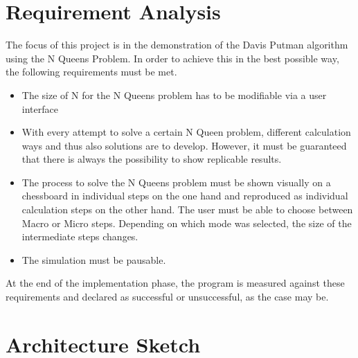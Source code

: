 \section{Requirement Analysis}
The focus of this project is in the demonstration of the Davis Putman algorithm using the N Queens Problem. In order to achieve this in the best possible way, the following requirements must be met. 
\begin{itemize}
\item The size of N for the N Queens problem has to be modifiable via a user interface
\item With every attempt to solve a certain N Queen problem, different calculation ways and thus also solutions are to develop. However, it must be guaranteed that there is always the possibility to show replicable results. 
\item The process to solve the N Queens problem must be shown visually on a chessboard in individual steps on the one hand and reproduced as individual calculation steps on the other hand. The user must be able to choose between Macro or Micro steps. Depending on which mode was selected, the size of the intermediate steps changes.
\item The simulation must be pausable.
\end{itemize}
At the end of the implementation phase, the program is measured against these requirements and declared as successful or unsuccessful, as the case may be. 

\section{Architecture Sketch}

